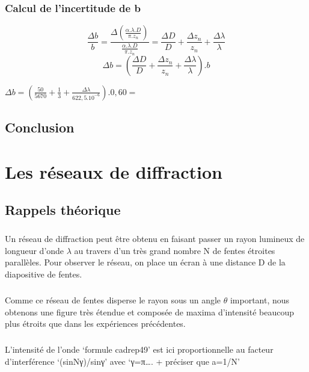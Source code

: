 \documentclass[11pt,a4paper]{report}
\begin{document}
		\subsection{Calcul de l'incertitude de b}
		\begin{equation}
		\frac{\Delta b}{b} = \frac{\Delta\left(\frac{\alpha .\lambda.D }{\pi.z_{n}}\right)}{\frac{\alpha .\lambda.D }{\pi.z_{n}}} 
		= \frac{\Delta D}{D}+\frac{\Delta z_{n}}{z_{n}} + \frac{\Delta \lambda}{\lambda}
		\end{equation}
		\begin{equation}
		\Delta b
		= \left(\frac{\Delta D}{D}+\frac{\Delta z_{n}}{z_{n}} + \frac{\Delta \lambda}{\lambda}\right).b
		\end{equation}
		\begin{center}
		$\Delta b = \left(\frac{50}{5670}+\frac{1}{3} + \frac{\Delta \lambda}{622,5.10^{-6}}\right).0,60 = $
		\end{center}
	\section{Conclusion}
\chapter{Les réseaux de diffraction}
	\section{Rappels théorique}
\paragraph{}	
	Un réseau de diffraction peut être obtenu en faisant passer un rayon lumineux de longueur d'onde $\lambda$ au travers d'un très grand nombre N de fentes étroites parallèles. Pour observer le réseau, on place un écran à une distance D de la diapositive de fentes.
\paragraph{}
Comme ce réseau de fentes disperse le rayon sous un angle $\theta$ important, nous obtenons une figure très étendue et composée de maxima d'intensité beaucoup plus étroits que dans les expériences précédentes.
\paragraph{}
L'intensité de l'onde ‘formule cadrep49’ est ici proportionnelle  au facteur d'interférence ‘(sinNγ)/sinγ’ avec ‘γ=π…. + préciser que a=1/N’
\end{document}
